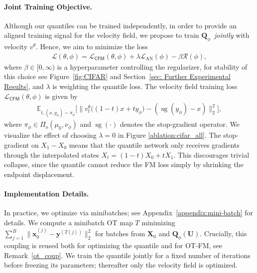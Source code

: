 \documentclass{article}
\newcommand{\ex}{\mathbb E}
\theoremstyle{plain}
\theoremstyle{definition}
\theoremstyle{remark}
\begin{document}
\paragraph{Joint Training Objective.} Although our quantiles can be trained independently, in order to provide an aligned training signal for the velocity field, we propose to train \(\mathbf Q_\phi\) \,\emph{jointly} with velocity \(v^\theta\). Hence, we aim to minimize the loss
\begin{align}\label{eq:our loss}
\mathcal L(\theta,\phi)=\mathcal {\mathcal L}_{\mathsf{CFM}}(\theta,\phi)+\lambda  {\mathcal L}_{\operatorname{AN}}(\phi) - \beta \mathcal R(\phi),
\end{align}
where $\beta \in [0,\infty)$ is a hyperparameter controlling the regularizer, for stability of this choice see Figure~\ref{fig:CIFAR} and Section~\ref{sec: Further Experimental Results},  and $\lambda$ is weighting the quantile loss.
The velocity field training loss  
${\mathcal L}_{\mathsf{CFM}}(\theta, \phi)$ is given by
\begin{align}
\ex_{t, (x,y_{\phi}) \sim \pi_\phi}
\Big[\big\|v^\theta_t\big((1-t)x +t y_{\phi}\big)-
( \operatorname{{sg}}(y_{\phi})-x)\big\|_2^2\Big],
\end{align}
where $\pi_\phi \in \Pi_o(\mu_0, \nu_\phi)$  and \(\operatorname{sg}(\cdot)\) denotes the stop-gradient operator. We visualize the effect of choosing $\lambda =0$ in Figure \ref{ablation:cifar_all}. The stop-gradient on $X_1-X_0$ means that the quantile network only receives gradients through the interpolated states $X_t=(1-t)X_0+tX_1$. This discourages trivial collapse, since the quantile cannot reduce the FM loss simply by shrinking the endpoint displacement.


\paragraph{Implementation Details.} In practice, we optimize via minibatches; see Appendix~\ref{appendix:mini-batch} for details. We compute a minibatch OT map \(T\) minimizing \(\sum_{j=1}^B \|\mathbf x_0^{(j)}-\mathbf y^{(T(j))}\|_2^2\) for batches from $\mathbf{X}_0$ and $\mathbf Q_\phi(\mathbf U)$. Crucially, this coupling is reused both for optimizing the quantile and for OT-FM, see Remark~\ref{ot_coup}. We train the quantile jointly for a fixed number of iterations before freezing its parameters; thereafter only the velocity field is optimized. 
\end{document}
